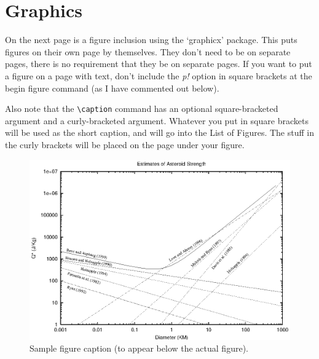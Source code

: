 \section{Graphics\label{graphics}}

On the next page is a figure inclusion using the `graphicx' package.
This puts figures on their own page by themselves.  They don't need
to be on separate pages, there is no requirement that they be on
separate pages.  If you want to put a figure on a page with text,
don't include the \emph{p!} option in square brackets at the begin
figure command (as I have commented out below).

Also note that the \verb=\caption= command has an optional
square-bracketed argument and a curly-bracketed argument.  Whatever
you put in square brackets will be used as the short caption, and
will go into the List of Figures.  The stuff in the curly brackets
will be placed on the page under your figure.

\begin{figure}[p!]
\begin{center}
\includegraphics{figure.eps}
\caption[Short figure caption for LOF]{Sample figure caption (to appear below
the actual figure). \label{samplefig}}
\end{center}
\end{figure}


